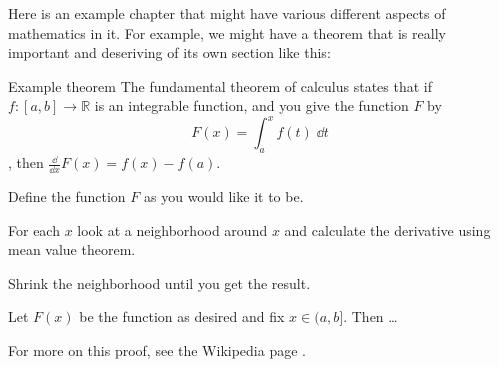 \documentclass[../notes.tex]{subfile}
\begin{document}
\begin{refsection}


Here is an example chapter that might have various different aspects of mathematics in it. For example, we might have a theorem that is really
important and deseriving of its own section like this:

\begin{Theorem}{Example theorem}
  The fundamental theorem of calculus states that if $f:[a,b]\to \mathbb{R}$ is an integrable function, and you give the function $F$ by
  \[
  F(x) = \int_{a}^x f(t)\;\dd t
  \], 
  then $\frac{\dd}{\dd x} F(x) = f(x) - f(a)$. 
\end{Theorem}
\begin{outline}
  \item Define the function $F$ as you would like it to be. 
  \item For each $x$ look at a neighborhood around $x$ and calculate the derivative using mean value theorem. 
  \item Shrink the neighborhood until you get the result.
\end{outline}
\begin{prf}
  Let $F(x)$ be the function as desired and fix $x \in (a, b]$. Then \ldots 
\end{prf}

For more on this proof, see the Wikipedia page \cite{ftc}.

\end{refsection}
\end{document}
